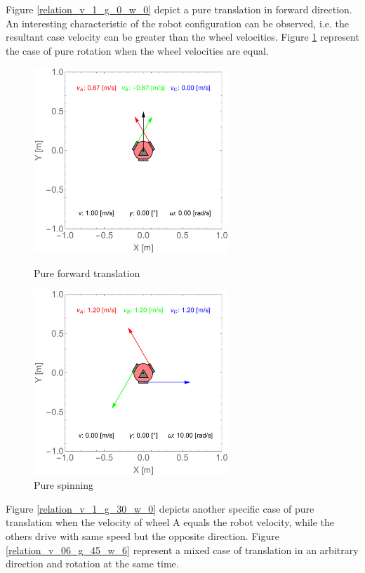 \documentclass[12pt,english,twoside]{article}
\begin{document}
Figure \ref{relation_v_1_g_0_w_0} depict a pure translation in forward direction. An interesting characteristic of the robot configuration can be observed, i.e. the resultant case velocity can be greater than the wheel velocities. Figure \ref{relation_v_0_g_0_w_10} represent the case of pure rotation when the wheel velocities are equal.
\begin{figure}[htb!]
	\centering
	\centering
	\includegraphics[height=7cm]{figures/2d_simulation/relation_v_1_g_0_w_0}
	\caption{Pure forward translation}
	\label{relation_v_1_g_0_w_0}
	\endminipage\hfill
	\centering
	\includegraphics[height=7cm]{figures/2d_simulation/relation_v_0_g_0_w_10}
	\caption{Pure spinning}
	\label{relation_v_0_g_0_w_10}
	\endminipage\hfill
\end{figure}
Figure \ref{relation_v_1_g_30_w_0} depicts another specific case of pure translation when the velocity of wheel A equals the robot velocity, while the others drive with same speed but the opposite direction. Figure \ref{relation_v_06_g_45_w_6} represent a mixed case of translation in an arbitrary direction and rotation at the same time.
\end{document}
